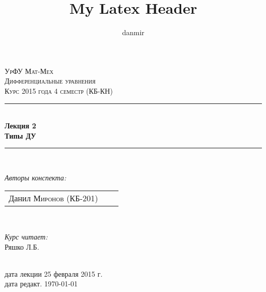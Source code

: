 \documentclass[12pt,a4paper,hidelinks]{article}            %
\begin{document}
\begin{titlepage}

\title{My Latex Header}
\author{danmir}

\vspace*{\fill}                                            %

\newcommand{\HRule}{\rule{\linewidth}{0.3mm}}              %

\center                                                    %

\textsc{\Large УрФУ Мат-Мех}\\[1.5cm]
\textsc{\Large Дифференциальные уравнения}\\[0.5cm]
\textsc{\large Курс 2015 года 4 семестр (КБ-КН)}\\[0.5cm]

\HRule \\[0.4cm]
{ \huge \bfseries Лекция 2 \\ Типы ДУ}\\[0.4cm]
\HRule \\[1.5cm]

\begin{minipage}{0.4\textwidth}
\begin{flushleft} \large
\emph{Авторы конспекта:}\\
\begin{tabular}{ l c r }
  Данил \textsc{Миронов (КБ-201)}\\
\end{tabular}
\end{flushleft}
\end{minipage}
~
\begin{minipage}{0.4\textwidth}
\begin{flushright} \large
\emph{Курс читает:} \\
Ряшко Л.Б. \textsc{}                                             %
\end{flushright}
\end{minipage}\\[4cm]

{дата лекции \large 25 февраля 2015 г.}\\
{дата редакт. \large \today}\\[3cm]                                              %


\vspace*{\fill}                                                           %

\end{titlepage}
\end{document}
